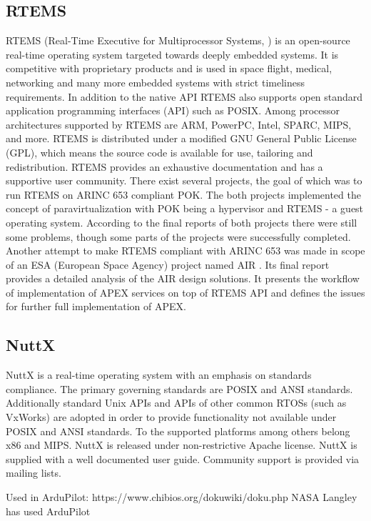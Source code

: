 \subsection{RTEMS}
RTEMS (Real-Time Executive for Multiprocessor Systems, \cite{rtems2023}) is an open-source real-time operating system targeted towards deeply embedded systems. It is competitive with proprietary products and is used in space flight, medical, networking and many more embedded systems with strict timeliness requirements. In addition to the native API RTEMS also supports open standard application programming interfaces (API) such as POSIX. Among processor architectures supported by RTEMS are ARM, PowerPC, Intel, SPARC, MIPS, and more. RTEMS is distributed under a modified GNU General Public License (GPL), which means the source code is available for use, tailoring and redistribution. RTEMS provides an exhaustive documentation and has a supportive user community. There exist several projects, the goal of which was to run RTEMS on ARINC 653 compliant POK. The both projects implemented the concept of paravirtualization with POK being a hypervisor and RTEMS - a guest operating system. According to the final reports of both projects there were still some problems, though some parts of the projects were successfully completed. Another attempt to make RTEMS compliant with ARINC 653 was made in scope of an ESA (European Space Agency) project named AIR \cite{air2007}. Its final report  provides a detailed analysis of the AIR design solutions. It presents the workflow of implementation of APEX services on top of RTEMS API and defines the issues for further full implementation of APEX.

\subsection{NuttX}
NuttX \cite{nuttx2023} is a real-time operating system with an emphasis on standards compliance. The primary governing standards are POSIX and ANSI standards. Additionally standard Unix APIs and APIs of other common RTOSs (such as VxWorks) are adopted in order to provide functionality not available under POSIX and ANSI standards. To the supported platforms among others belong x86 and MIPS. NuttX is released under non-restrictive Apache license. NuttX is supplied with a well documented user guide. Community support is provided via mailing lists.

Used in ArduPilot: https://www.chibios.org/dokuwiki/doku.php
NASA Langley has used ArduPilot

